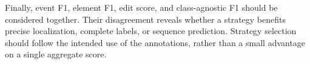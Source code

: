 Finally, event F1, element F1, edit score, and class-agnostic F1 should be considered together. Their disagreement reveals whether a strategy benefits precise localization, complete labels, or sequence prediction. Strategy selection should follow the intended use of the annotations, rather than a small advantage on a single aggregate score.
